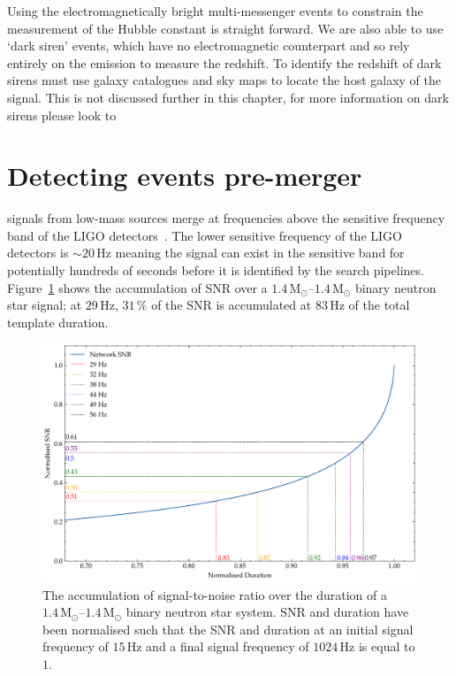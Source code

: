 Using the electromagnetically bright multi-messenger events to constrain the measurement of the Hubble constant is straight forward. We are also able to use `dark siren' events, which have no electromagnetic counterpart and so rely entirely on the \gwadj emission to measure the redshift. To identify the redshift of dark sirens must use galaxy catalogues and \gwadj sky maps to locate the host galaxy of the \gwadj signal. This is not discussed further in this chapter, for more information on dark sirens please look to~\cite{DES:2019, Dalang_dark_sirens:2023}

\section{\label{6:sec:early-warning-search}Detecting \gwadj events pre-merger}

\Gwadj signals from low-mass sources merge at frequencies above the sensitive frequency band of the LIGO \gwadj detectors~\cite{aLIGO_design_curve:2018}. The lower sensitive frequency of the LIGO detectors is ${\sim}20 \, \text{Hz}$ meaning the \gwadj signal can exist in the sensitive band for potentially hundreds of seconds before it is identified by the \gwadj search pipelines. Figure~\ref{6:fig:snr_accumulation} shows the accumulation of SNR over a $1.4 \, \text{M}_{\odot}{\text{--}}1.4 \, \text{M}_{\odot}$ binary neutron star signal; at $29 \, \text{Hz}$, 
$31 \, \text{\%}$ of the SNR is accumulated at $83 \, \text{Hz}$ of the total template duration.
%
\begin{figure}
    \centering
    \includegraphics[width=1.0\linewidth]{images/6_earlywarning/snr_accumulation.pdf}
    \caption{The accumulation of signal-to-noise ratio over the duration of a $1.4 \, \text{M}_{\odot}{\text{--}}1.4 \, \text{M}_{\odot}$ binary neutron star system. SNR and duration have been normalised such that the SNR and duration at an initial signal frequency of $15 \, \text{Hz}$ and a final signal frequency of $1024 \, \text{Hz}$ is equal to $1$.}
    \label{6:fig:snr_accumulation}
\end{figure}
%

